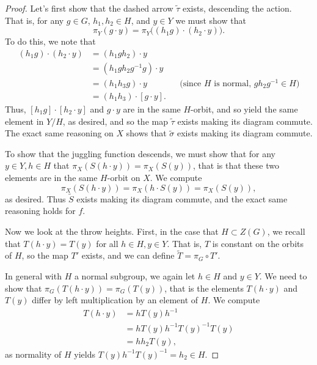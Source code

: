 \documentclass[12nt]{article}
\theoremstyle{plain}
\begin{document}
\begin{proof}
Let's first show that the dashed arrow $\widetilde{\tau}$ exists, descending the action. That is, for any  $g \in G$, $h_1, h_2 \in H$, and $y \in Y$ we must show that \[\pi_Y(g \cdot y) = \pi_Y\Big((h_1g) \cdot (h_2 \cdot y)\Big).\] To do this, we note that 
\begin{align*}
(h_1g) \cdot (h_2 \cdot y) &= (h_1gh_2) \cdot y \\
	&= (h_1gh_2g^{-1}g) \cdot y \\
	&= (h_1h_3g) \cdot y && \text{(since $H$ is normal, $gh_2g^{-1} \in H$)} \\
	&= (h_1h_3) \cdot [g \cdot y].
\end{align*}
Thus, $[h_1g] \cdot [h_2 \cdot y]$ and $g \cdot y$ are in the same $H$-orbit, and so yield the same element in $Y/H$, as desired, and so the map $\widetilde{\tau}$ exists making its diagram commute. The exact same reasoning on $X$ shows that $\widetilde{\sigma}$ exists making its diagram commute. 

To show that the juggling function descends, we must show that for any $y \in Y, h \in H$ that $\pi_X(S(h \cdot y)) = \pi_X(S(y))$, that is that these two elements are in the same $H$-orbit on $X$. We compute
\[
\pi_X(S(h \cdot y)) = \pi_X (h \cdot S(y)) = \pi_X(S(y)),
\]
as desired. Thus $\widetilde{S}$ exists making its diagram commute, and the exact same reasoning holds for $f$. 

Now we look at the throw heights. First, in the case that $H \subset Z(G)$, we recall that $T(h \cdot y) = T(y)$ for all $h \in H, y \in Y$. That is, $T$ is constant on the orbits of $H$, so the map $T'$ exists, and we can define $\widetilde{T} = \pi_G \circ T'$. 

In general with $H$ a normal subgroup, we again let $h \in H$ and $y \in Y$. We need to show that $\pi_G(T(h \cdot y)) = \pi_G(T(y))$, that is the elements $T(h \cdot y)$ and $T(y)$ differ by left multiplication by an element of $H$. We compute
\begin{align*}
T(h \cdot y) &= hT(y)h^{-1} \\
	&= h T(y) h^{-1}T(y)^{-1}T(y) \\
	&= h h_2 T(y),
\end{align*}
as normality of $H$ yields $T(y)h^{-1}T(y)^{-1} = h_2 \in H$. 


\end{proof}
\end{document}
